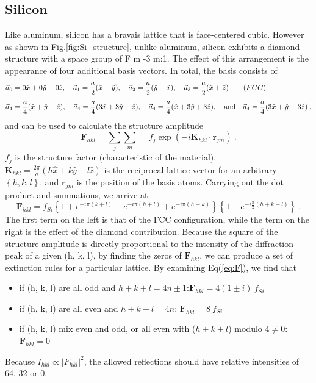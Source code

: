 \documentclass[12pt]{article}
\begin{document}
\subsection{Silicon}
Like aluminum, silicon has a bravais lattice that is face-centered cubic. However as shown in Fig.\ref{fig:Si_structure}, unlike aluminum, silicon exhibits a diamond structure with a space group of F m -3 m:1. The effect of this arrangement is the appearance of four additional basis vectors. In total, the basis consists of \cite{streetman}
\begin{equation*}
\begin{split}
& \vec{a}_0 = 0\hat{x} + 0\hat{y} + 0\hat{z}, \quad \vec{a}_1 = \frac{a}{2}(\hat{x} + \hat{y}), \quad \vec{a}_2 = \frac{a}{2}(\hat{y} + \hat{x}), \quad \vec{a}_3 = \frac{a}{2}(\hat{x} + \hat{z}) \qquad\text(FCC)
\\[1ex]
& \vec{a}_4 = \frac{a}{4}(\hat{x} + \hat{y} + \hat{z}), \quad \vec{a}_4 = \frac{a}{4}(3\hat{x} + 3\hat{y} + \hat{z}), \quad \vec{a}_4 = \frac{a}{4}(\hat{x} + 3\hat{y} + 3\hat{z}), \quad\text{and}\quad \vec{a}_4 = \frac{a}{4}(3\hat{x} + \hat{y} + 3\hat{z})\:,
\end{split}
\end{equation*}
and can be used to calculate the structure amplitude 
\begin{equation}
\textbf{F}_{hkl} = \sum_j\sum_m = f_j \exp(-i\textbf{K}_{hkl} \cdot \textbf{r}_{jm})\:.
\end{equation}
$f_j$ is the structure factor (characteristic of the material), $\textbf{K}_{hkl} = \frac{2\pi}{a}(h\hat{x} + k\hat{y} + l\hat{z})$ is the reciprocal lattice vector for an arbitrary $\left\{h, k, l\right\}$, and $\textbf{r}_{jm}$ is the position of the basis atoms. Carrying out the dot product and summations, we arrive at
\begin{equation}\label{eq:F}
\textbf{F}_{hkl} = f_{Si}\left\{ 1+ e^{-i\pi(k+l)} + e^{-i\pi(h+l)} + e^{-i\pi(h+k)} \right\}\left\{ 1 + e^{-i\frac{\pi}{2}(h+k+l)} \right\}\:.
\end{equation}
The first term on the left is that of the FCC configuration, while the term on the right is the effect of the diamond contribution. Because the square of the structure amplitude is directly proportional to the intensity of the diffraction peak of a given (h, k, l), by finding the zeros of $\textbf{F}_{hkl}$, we can produce a set of extinction rules for a particular lattice. By examining Eq(\ref{eq:F}), we find that 
\begin{itemize}
\item if (h, k, l) are all odd and $h+k+l = 4n\pm 1$:\quad $\textbf{F}_{hkl} = 4(1\pm i)\:f_{Si}$
\item if (h, k, l) are all even and $h+k+l = 4n$: \qquad $\textbf{F}_{hkl} = 8\:f_{Si}$
\item if (h, k, l) mix even and odd, or all even with ($h + k + l$) modulo $4 \neq 0$: \quad $\textbf{F}_{hkl} = 0$
\end{itemize}
Because $I_{hkl}\propto |F_{hkl}|^2$, the allowed reflections should have relative intensities of 64, 32 or 0.\\
\end{document}

